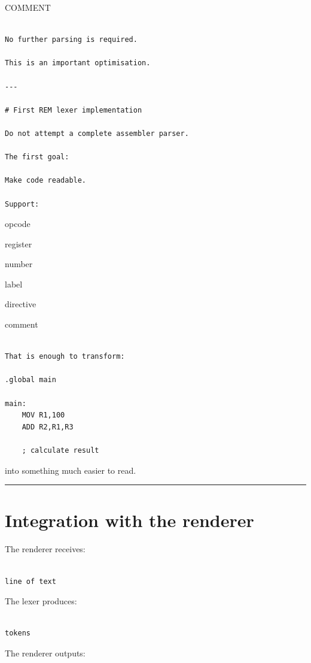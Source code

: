 \documentclass[
  oneside,
  openany]{book}
\begin{document}
COMMENT

\begin{verbatim}

No further parsing is required.

This is an important optimisation.

---

# First REM lexer implementation

Do not attempt a complete assembler parser.

The first goal:

Make code readable.

Support:
\end{verbatim}

opcode

register

number

label

directive

comment

\begin{verbatim}

That is enough to transform:

.global main

main:
    MOV R1,100
    ADD R2,R1,R3

    ; calculate result
\end{verbatim}

into something much easier to read.

\begin{center}\rule{0.5\linewidth}{0.5pt}\end{center}

\hypertarget{integration-with-the-renderer}{%
\section{Integration with the
renderer}\label{integration-with-the-renderer}}

The renderer receives:

\begin{verbatim}

line of text
\end{verbatim}

The lexer produces:

\begin{verbatim}

tokens
\end{verbatim}

The renderer outputs:
\end{document}
